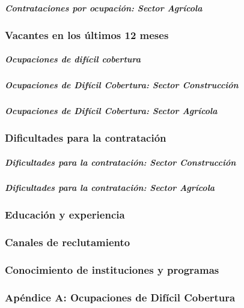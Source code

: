 \documentclass[
]{article}
\begin{document}
\subparagraph{Contrataciones por ocupación: Sector
Agrícola}\label{contrataciones-por-ocupaciuxf3n-sector-agruxedcola}

\subsubsection{Vacantes en los últimos 12
meses}\label{vacantes-en-los-uxfaltimos-12-meses}

\subparagraph{Ocupaciones de difícil
cobertura}\label{ocupaciones-de-difuxedcil-cobertura}

\subparagraph{Ocupaciones de Difícil Cobertura: Sector
Construcción}\label{ocupaciones-de-difuxedcil-cobertura-sector-construcciuxf3n}

\subparagraph{Ocupaciones de Difícil Cobertura: Sector
Agrícola}\label{ocupaciones-de-difuxedcil-cobertura-sector-agruxedcola}

\subsubsection{Dificultades para la
contratación}\label{dificultades-para-la-contrataciuxf3n}

\subparagraph{Dificultades para la contratación: Sector
Construcción}\label{dificultades-para-la-contrataciuxf3n-sector-construcciuxf3n}

\subparagraph{Dificultades para la contratación: Sector
Agrícola}\label{dificultades-para-la-contrataciuxf3n-sector-agruxedcola}

\subsubsection{Educación y
experiencia}\label{educaciuxf3n-y-experiencia}

\subsubsection{Canales de reclutamiento}\label{canales-de-reclutamiento}

\subsubsection{Conocimiento de instituciones y
programas}\label{conocimiento-de-instituciones-y-programas}

\subsubsection{Apéndice A: Ocupaciones de Difícil
Cobertura}\label{apuxe9ndice-a-ocupaciones-de-difuxedcil-cobertura}
\end{document}
